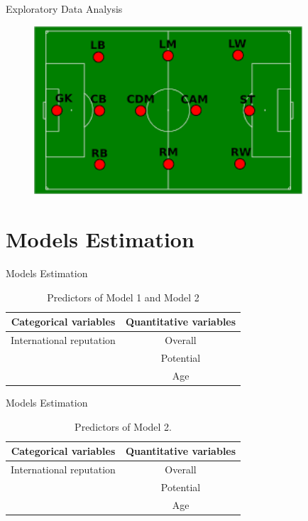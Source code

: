 \documentclass[aspectratio=169,xcolor=dvipsnames]{beamer}
\begin{document}
\begin{frame}{Exploratory Data Analysis}
\begin{figure}[H] 
\begin{center} 
  \includegraphics[width=10cm]{images.png}\\ 
\end{center} 
\end{figure}
\end{frame}


\section{Models Estimation}



\begin{frame}{Models Estimation}
\begin{table}[ht]
\centering
\begin{tabular}{cc}
  \hline
    Categorical variables & Quantitative variables \\ 
  \hline
    International reputation & Overall \\ 
        & Potential \\ 
        & Age \\ 
   \hline
\end{tabular}
\caption{Predictors of Model 1 and Model 2}
\end{table}
\end{frame}


\begin{frame}{Models Estimation}
\begin{table}[ht]
\centering
\begin{tabular}{cc}
  \hline
    Categorical variables & Quantitative variables \\ 
  \hline
    International reputation & Overall \\ 
        & Potential \\ 
        & Age \\ 
   \hline
\end{tabular}
\caption{Predictors of Model 2.}
\end{table}
\end{frame}
\end{document}
